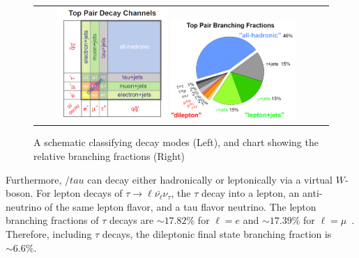 \begin{figure}[!h]
  \begin{center}
    \begin{tabular}{cc}
        \includegraphics[width=0.40\textwidth]{fig_TopQuark/Top_Pair_Decay_Channels.png}
        \includegraphics[width=0.45\textwidth]{fig_TopQuark/Top_Pair_Branching_Fractions.png}
    \end{tabular}
    \caption{A schematic classifying \ttbar decay modes (Left), and chart showing the relative branching fractions (Right)~\cite{d0_diagrams}
            }
    \label{Top_Pair_Decay_Channels}
  \end{center}
\end{figure}
Furthermore, $/tau$ can decay either hadronically or leptonically via a virtual $W$-boson.
For lepton decays of $\tau \rightarrow \ell \bar{\nu_\ell} \nu_\tau$, the $\tau$ decay into a lepton, an anti-neutrino of the same lepton flavor, and a tau flavor neutrino.
The lepton branching fractions of $\tau$ decays are $\sim 17.82 \%$ for $\ell = e$ and $\sim 17.39 \%$ for $\ell = \mu$~\cite{bib:PDG}.
Therefore, including $\tau$ decays, the \ttbar dileptonic final state branching fraction is $\sim 6.6 \%$.

